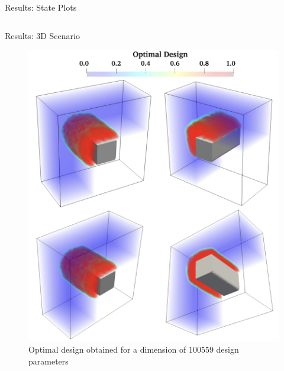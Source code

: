 \documentclass[10pt,xcolor=dvipsnames,compress]{beamer}
\begin{document}
\begin{frame}{Results: State Plots}
\begin{figure}
\begin{tabular}{c c c c}
    \end{tabular}
    \label{fig:enter-label}
\end{figure}
\end{frame}
\begin{frame}{Results: 3D Scenario}
    \begin{figure}
        \centering
        \includegraphics[width=0.52\linewidth]{Figures/3D_F.png}\\
        \footnotesize{Optimal design obtained for a dimension of 100559 design parameters}\\
        \label{fig:enter-label}
    \end{figure}
\end{frame}




\end{document}
